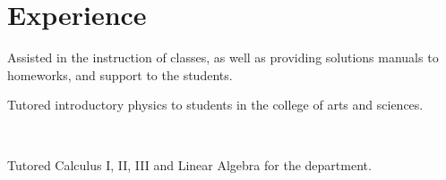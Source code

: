 
\section{Experience}

\vspace{\topsep} %
\begin{tightemize}\item Assisted in the instruction of classes, as well as
        providing solutions manuals to homeworks, and support to the students.
\end{tightemize}
\sectionsep

\vspace{\topsep} %
\begin{tightemize}\item Tutored introductory physics to students in the college of arts
and sciences. 
\end{tightemize}
\sectionsep

\\
\begin{tightemize}
\item Tutored Calculus I, II, III and Linear Algebra for the department. 
\end{tightemize}
\sectionsep
